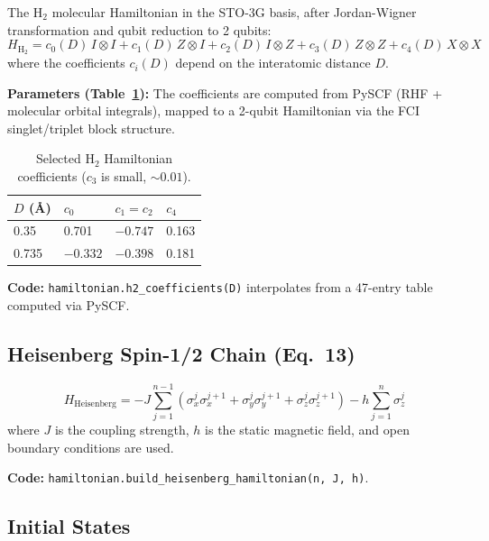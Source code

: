 \documentclass[11pt,a4paper]{article}
\begin{document}
The H$_2$ molecular Hamiltonian in the STO-3G basis, after Jordan-Wigner transformation and qubit reduction to 2 qubits:
\begin{equation}
  H_{\mathrm{H}_2} = c_0(D)\, I \otimes I
    + c_1(D)\, Z \otimes I
    + c_2(D)\, I \otimes Z
    + c_3(D)\, Z \otimes Z
    + c_4(D)\, X \otimes X
  \label{eq:h2}
\end{equation}
where the coefficients $c_i(D)$ depend on the interatomic distance $D$.

\textbf{Parameters (Table~\ref{tab:h2}):} The coefficients are computed from PySCF (RHF + molecular orbital integrals), mapped to a 2-qubit Hamiltonian via the FCI singlet/triplet block structure.

\begin{table}[h]
\centering
\begin{tabular}{llll}
\toprule
$D$ (\AA) & $c_0$ & $c_1 = c_2$ & $c_4$ \\
\midrule
0.35 & 0.701 & $-0.747$ & 0.163 \\
0.735 & $-0.332$ & $-0.398$ & 0.181 \\
\bottomrule
\end{tabular}
\caption{Selected H$_2$ Hamiltonian coefficients ($c_3$ is small, $\sim 0.01$).}
\label{tab:h2}
\end{table}

\noindent\textbf{Code:} \texttt{hamiltonian.h2\_coefficients(D)} interpolates from a 47-entry table computed via PySCF.

\subsection{Heisenberg Spin-1/2 Chain (Eq.~13)}

\begin{equation}
  H_{\mathrm{Heisenberg}} = -J\sum_{j=1}^{n-1}
    \left(\sigma_x^j\sigma_x^{j+1} + \sigma_y^j\sigma_y^{j+1} + \sigma_z^j\sigma_z^{j+1}\right)
    - h\sum_{j=1}^{n}\sigma_z^j
  \label{eq:heisenberg}
\end{equation}
where $J$ is the coupling strength, $h$ is the static magnetic field, and open boundary conditions are used.

\noindent\textbf{Code:} \texttt{hamiltonian.build\_heisenberg\_hamiltonian(n, J, h)}.

\subsection{Initial States}
\end{document}
